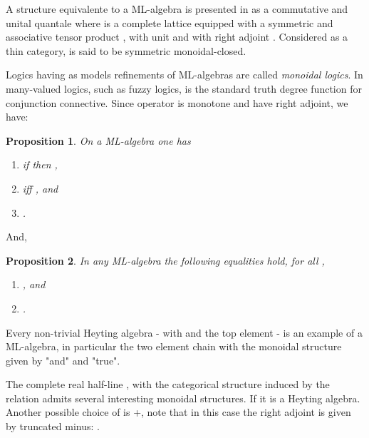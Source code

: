 \documentclass[oribibl]{llncs}
\newtheorem{prop}{Proposition}
\begin{document}
A structure equivalente to a ML-algebra is presented in \cite{Clementino04} as a commutative and unital quantale where  is a complete lattice equipped with a symmetric and associative tensor product , with unit  and with right adjoint . Considered  as a thin category,  is said to be symmetric monoidal-closed.

Logics having as models refinements of ML-algebras are called
\emph{monoidal logics}. In many-valued logics, such as fuzzy logics,
 is the standard truth degree function for conjunction
connective. Since operator  is monotone and have right adjoint, we have:

\begin{prop}
On a ML-algebra one has
\begin{enumerate}
  \item if  then ,
  \item  iff , and
  \item .
\end{enumerate}
\end{prop}

And,

\begin{prop}\cite{klawonn??}\label{prop:implic}
In any ML-algebra the following equalities hold, for all  ,
\begin{enumerate}
  \item , and
  \item .
\end{enumerate}
\end{prop}

Every non-trivial Heyting algebra - with  and  the top element - is an example of a ML-algebra, in particular the two element chain  with the monoidal structure given by "and" and "true".

The complete real half-line , with the categorical structure induced by the relation  admits several interesting monoidal structures. If  it is a Heyting algebra. Another possible choice of  is +, note that in this case the right adjoint  is given by truncated minus: .
\end{document}
